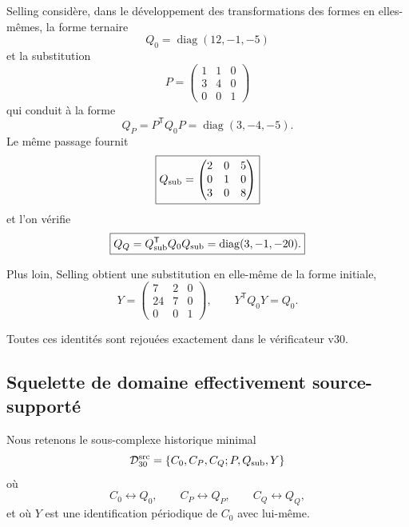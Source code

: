 \documentclass[11pt,a4paper]{article}
\begin{document}
Selling considère, dans le développement des transformations des formes en elles-mêmes, la forme ternaire
\begin{equation}\label{eq:v30-Q0}
 \boxed{
 Q_0
 =
 \operatorname{diag}(12,-1,-5)}
\end{equation}
et la substitution
\begin{equation}\label{eq:v30-P}
 \boxed{
 P=
 \begin{pmatrix}
 1&1&0\\
 3&4&0\\
 0&0&1
 \end{pmatrix}}
\end{equation}
qui conduit à la forme
\begin{equation}\label{eq:v30-QP}
 \boxed{
 Q_P
 =
 P^{\mathsf T}Q_0P
 =
 \operatorname{diag}(3,-4,-5).}
\end{equation}
Le même passage fournit
\begin{equation}\label{eq:v30-Qsub}
 \boxed{
 Q_{\rm sub}
 =
 \begin{pmatrix}
 2&0&5\\
 0&1&0\\
 3&0&8
 \end{pmatrix}}
\end{equation}
et l'on vérifie
\begin{equation}\label{eq:v30-QQ}
 \boxed{
 Q_Q
 =
 Q_{\rm sub}^{\mathsf T}Q_0Q_{\rm sub}
 =
 \operatorname{diag}(3,-1,-20).}
\end{equation}

Plus loin, Selling obtient une substitution en elle-même de la forme initiale,
\begin{equation}\label{eq:v30-Y}
 \boxed{
 Y=
 \begin{pmatrix}
 7&2&0\\
 24&7&0\\
 0&0&1
 \end{pmatrix},
 \qquad
 Y^{\mathsf T}Q_0Y=Q_0.}
\end{equation}

Toutes ces identités sont rejouées exactement dans le vérificateur v30.

\subsection{Squelette de domaine effectivement source-supporté}

Nous retenons le sous-complexe historique minimal
\[
 \mathcal D_{30}^{\rm src}
 =
 \{C_0,C_P,C_Q;P,Q_{\rm sub},Y\}
\]
où
\[
 C_0\leftrightarrow Q_0,\qquad
 C_P\leftrightarrow Q_P,\qquad
 C_Q\leftrightarrow Q_Q,
\]
et où $Y$ est une identification périodique de $C_0$ avec lui-même.
\end{document}
